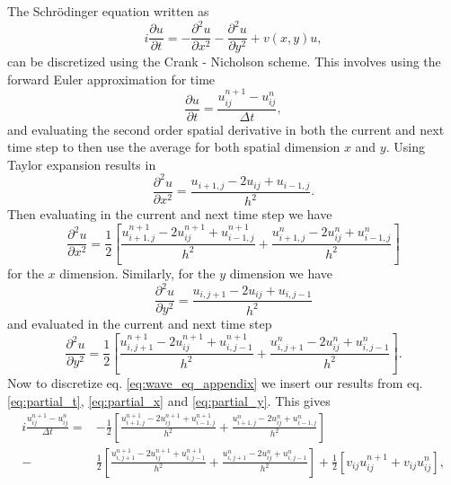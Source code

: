 \documentclass[english,notitlepage,reprint,nofootinbib]{revtex4-1}  %
\begin{document}
The Schrödinger equation written as
\begin{equation}
    i \frac{\partial u}{\partial t} = - \frac{\partial^2 u}{\partial x^2} - \frac{\partial^2 u}{\partial y^2} + v(x,y)u, \label{eq:wave_eq_appendix}
\end{equation}
can be discretized using the Crank - Nicholson scheme. This involves using the forward Euler approximation for time 
\begin{equation}
    \frac{\partial u}{\partial t} = \frac{u_{ij}^{n+1} - u_{ij}^n}{\Delta t}, \label{eq:partial_t}
\end{equation}
and evaluating the second order spatial derivative in both the current and next time step to then use the average for both spatial dimension $x$ and $y$. Using Taylor expansion results in
\begin{equation}
    \frac{\partial^2 u}{\partial x^2} = \frac{u_{i+1,j} -2u_{ij} + u_{i-1,j}}{h^2}.
\end{equation}
Then evaluating in the current and next time step we have
\begin{equation}
    \frac{\partial^2 u}{\partial x^2} = \frac{1}{2} \left[ \frac{u_{i+1,j}^{n+1} -2u_{ij}^{n+1} + u_{i-1,j}^{n+1}}{h^2} 
    + \frac{u_{i+1,j}^{n} -2u_{ij}^{n} + u_{i-1,j}^{n}}{h^2} \right] \label{eq:partial_x}
\end{equation}
for the $x$ dimension. Similarly, for the $y$ dimension we have
\begin{equation}
    \frac{\partial^2 u}{\partial y^2} = \frac{u_{i,j+1} -2u_{ij} + u_{i,j-1}}{h^2}
\end{equation}
and evaluated in the current and next time step
\begin{equation}
    \frac{\partial^2 u}{\partial y^2} = \frac{1}{2} \left[ \frac{u_{i,j+1}^{n+1} -2u_{ij}^{n+1} + u_{i,j-1}^{n+1}}{h^2}
    + \frac{u_{i,j+1}^{n} -2u_{ij}^{n} + u_{i,j-1}^{n}}{h^2} \right]. \label{eq:partial_y}
\end{equation}
Now to discretize eq. \ref{eq:wave_eq_appendix} we insert our results from eq. \ref{eq:partial_t}, \ref{eq:partial_x} and \ref{eq:partial_y}. This gives
\begin{align}
    i \frac{u_{ij}^{n+1} - u_{ij}^n}{\Delta t} 
    =& - \frac{1}{2} \left[ \frac{u_{i+1,j}^{n+1} -2u_{ij}^{n+1} + u_{i-1,j}^{n+1}}{h^2} 
    + \frac{u_{i+1,j}^{n} -2u_{ij}^{n} + u_{i-1,j}^{n}}{h^2} \right] \\
     -& \frac{1}{2} \left[ \frac{u_{i,j+1}^{n+1} -2u_{ij}^{n+1} + u_{i,j-1}^{n+1}}{h^2}
     + \frac{u_{i,j+1}^{n} -2u_{ij}^{n} + u_{i,j-1}^{n}}{h^2} \right]
     + \frac{1}{2} \left[ v_{ij}u_{ij}^{n+1} + v_{ij}u_{ij}^n \right], 
\end{align}
\end{document}
